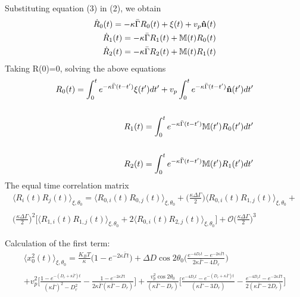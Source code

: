 \documentclass[]{article}
\begin{document}
Substituting equation (3) in (2), we obtain
\begin{equation} 
\begin{split}
\dot R_0(t)=-\kappa \bar \Gamma R_0(t) + \xi(t)+ v_p \bold{\hat n}(t)
\\
\dot R_1(t)=-\kappa \bar \Gamma R_1(t)+ \mathbb{M}(t)R_0(t)
\\
\dot R_2(t)=-\kappa \bar \Gamma R_2(t)+ \mathbb{M}(t)R_1(t)
\end{split}
\end{equation}
Taking R(0)=0, solving the above equations
\begin{equation} \label{}
\begin{split}
R_0(t)= \int_0^t e^{-\kappa \bar\Gamma(t-t^\prime)}\xi(t^\prime)dt^\prime+ v_p\int_0^t e^{-\kappa \bar\Gamma(t-t^\prime)}\bold{\hat n}(t^\prime)dt^\prime
\\ \\
R_1(t)= \int_0^t e^{-\kappa \bar\Gamma(t-t^\prime)} \mathbb{M}(t^\prime)R_0(t^\prime)dt^\prime
\\ \\
R_2(t)= \int_0^t e^{-\kappa \bar\Gamma(t-t^\prime)} \mathbb{M}(t^\prime)R_1(t^\prime)dt^\prime
\end{split}
\end{equation}
\clearpage
The equal time correlation matrix
\newline
\begin{equation} \label{}
\begin{split}
\langle R_i(t)R_j(t)\rangle_{\xi,\theta_0} =\langle R_{0,i}(t)R_{0,j}(t)\rangle_{\xi,\theta_0} + \bigg(\frac{\kappa \Delta \Gamma}{2}\bigg)\langle R_{0,i}(t)R_{1,j}(t)\rangle_{\xi,\theta_0}+\\ \\ \bigg(\frac{\kappa \Delta \Gamma}{2}\bigg)^2 \bigg[\langle R_{1,i}(t)R_{1,j}(t)\rangle_{\xi,\theta_0}+  2\langle R_{0,i}(t)R_{2,j}(t)\rangle_{\xi,\theta_0}\bigg] +\mathcal{O}\bigg(\frac{\kappa \Delta \Gamma}{2}\bigg)^3
\end{split}
\end{equation}
\newline

Calculation of the first term:
\newline
\begin{multline*}
\langle x_{0}^2(t)\rangle_{\xi,\theta_0} =\frac{K_B T}{\kappa}\bigg(1- e^{-2\kappa\bar \Gamma t}\bigg) + \Delta D \cos 2\theta_0 \bigg( \frac{e^{-4 D_r t}- e^{-2\kappa \bar\Gamma t}}{2\kappa \bar\Gamma-4D_r}\bigg)\\ \\ + v_p^2\bigg[ \frac{1-e^{-(D_r+\kappa \bar \Gamma)t}}{(\kappa \bar \Gamma)^2 -D_r^2}-\frac{1-e^{-2\kappa \bar \Gamma t}}{2\kappa \bar \Gamma(\kappa \bar \Gamma-D_r)}\bigg]+\frac{v_p^2\cos 2\theta_0}{(\kappa \bar \Gamma-D_r)}\bigg[ \frac{e^{-4D_rt}-e^{-(D_r+\kappa \bar \Gamma)t}}{(\kappa \bar \Gamma -3D_r)}-\frac{e^{-4D_rt}-e^{-2\kappa \bar \Gamma t}}{2(\kappa \bar \Gamma-2D_r)}\bigg]
\end{multline*}
\newline
\end{document}
